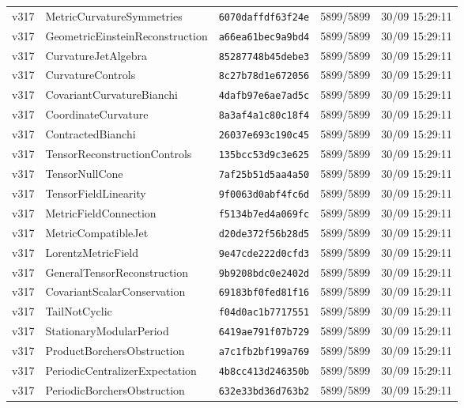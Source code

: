 \documentclass[11pt]{article}
\theoremstyle{definition}\newtheorem{deriv}{Derivação}
\begin{document}
{\begin{longtable}{@{}lllll@{}}
v317 & MetricCurvatureSymmetries & \texttt{6070daffdf63f24e} & 5899/5899 & 30/09 15:29:11 \\
v317 & GeometricEinsteinReconstruction & \texttt{a66ea61bec9a9bd4} & 5899/5899 & 30/09 15:29:11 \\
v317 & CurvatureJetAlgebra & \texttt{85287748b45debe3} & 5899/5899 & 30/09 15:29:11 \\
v317 & CurvatureControls & \texttt{8c27b78d1e672056} & 5899/5899 & 30/09 15:29:11 \\
v317 & CovariantCurvatureBianchi & \texttt{4dafb97e6ae7ad5c} & 5899/5899 & 30/09 15:29:11 \\
v317 & CoordinateCurvature & \texttt{8a3af4a1c80c18f4} & 5899/5899 & 30/09 15:29:11 \\
v317 & ContractedBianchi & \texttt{26037e693c190c45} & 5899/5899 & 30/09 15:29:11 \\
v317 & TensorReconstructionControls & \texttt{135bcc53d9c3e625} & 5899/5899 & 30/09 15:29:11 \\
v317 & TensorNullCone & \texttt{7af25b51d5aa4a50} & 5899/5899 & 30/09 15:29:11 \\
v317 & TensorFieldLinearity & \texttt{9f0063d0abf4fc6d} & 5899/5899 & 30/09 15:29:11 \\
v317 & MetricFieldConnection & \texttt{f5134b7ed4a069fc} & 5899/5899 & 30/09 15:29:11 \\
v317 & MetricCompatibleJet & \texttt{d20de372f56b28d5} & 5899/5899 & 30/09 15:29:11 \\
v317 & LorentzMetricField & \texttt{9e47cde222d0cfd3} & 5899/5899 & 30/09 15:29:11 \\
v317 & GeneralTensorReconstruction & \texttt{9b9208bdc0e2402d} & 5899/5899 & 30/09 15:29:11 \\
v317 & CovariantScalarConservation & \texttt{69183bf0fed81f16} & 5899/5899 & 30/09 15:29:11 \\
v317 & TailNotCyclic & \texttt{f04d0ac1b7717551} & 5899/5899 & 30/09 15:29:11 \\
v317 & StationaryModularPeriod & \texttt{6419ae791f07b729} & 5899/5899 & 30/09 15:29:11 \\
v317 & ProductBorchersObstruction & \texttt{a7c1fb2bf199a769} & 5899/5899 & 30/09 15:29:11 \\
v317 & PeriodicCentralizerExpectation & \texttt{4b8cc413d246350b} & 5899/5899 & 30/09 15:29:11 \\
v317 & PeriodicBorchersObstruction & \texttt{632e33bd36d763b2} & 5899/5899 & 30/09 15:29:11 \\

\end{longtable}}
\end{document}
